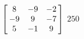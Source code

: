 {$\left[\hskip -3pt \begin{array}{ccc} 8&-9&-2\\  -9&9&-7
\\  5&-1&9\end{array}\hskip -3pt \right] $} 
{$250$}

  

 

